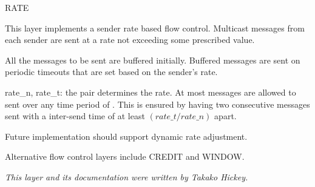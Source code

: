 %
%
%
\begin{Layer}{RATE}

This layer implements a sender rate based flow control.  Multicast messages
from each sender are sent at a rate not exceeding some prescribed value.

\begin{Protocol}
All the messages to be sent are buffered initially.  Buffered messages are
sent on periodic timeouts that are set based on the sender's rate.
\end{Protocol}

\begin{Parameters}
\item
rate\_n, rate\_t: the pair determines the rate.  At most 
messages are allowed to sent over any time period of .  This
is ensured by having two consecutive messages sent with a inter-send time
of at least $(rate\_t / rate\_n)$ apart.
\end{Parameters}


\begin{Notes}
\item Future implementation should support dynamic rate adjustment.
\item Alternative flow control layers include CREDIT and WINDOW.
\end{Notes}

\begin{Sources}
\end{Sources}

\emph{This layer and its documentation were written by Takako Hickey.}
\end{Layer}
